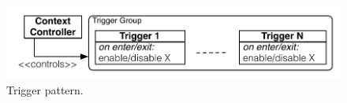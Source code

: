 \begin{figure}[tb]
\begin{center}
\includegraphics[scale=.5]{imgs/con_act}
\vspace{-3mm}
\caption{Trigger pattern.}
  \label{fig:trigger}
\vspace{-10mm}
\end{center}
\end{figure}


